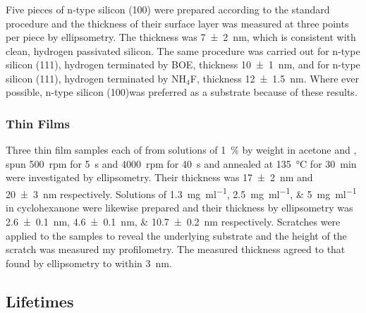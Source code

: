\subsubsection{\sih{}}
Five pieces of \sih{} n-type silicon (100) were prepared according to the standard procedure and the thickness of their surface layer was measured at three points per piece by ellipsometry. The thickness was \SI{7+-2}{\nano\metre}, which is consistent with clean, hydrogen passivated silicon. The same procedure was carried out for n-type silicon (111), hydrogen terminated by BOE, thickness \SI{10+-1}{\nano\metre}, and for n-type silicon (111), hydrogen terminated by NH$_4$F, thickness \SI{12+-1.5}{\nano\metre}. Where ever possible, n-type silicon (100)was preferred as a substrate because of these results.
\subsubsection{\pvdf{} Thin Films}
Three thin film samples each of \pvdf{} from solutions of \SI{1}{\percent} by weight in acetone and \dmf{}, spun \SI{500}{rpm} for \SI{5}{\second} and \SI{4000}{rpm} for \SI{40}{\second} and annealed at \SI{135}{\degreeCelsius} for \SI{30}{\minute} were investigated by ellipsometry. Their thickness was \SI{17+-2}{\nano\metre} and \SI{20+-3}{\nano\metre} respectively. Solutions of \SIlist{1.3;2.5;5}{\milli\gram\per\milli\litre} \pvdf{} in cyclohexanone were likewise prepared and their thickness by ellipsometry was \SIlist{2.6+-0.1;4.6+-0.1;10.7+-0.2}{\nano\metre} respectively. Scratches were applied to the samples to reveal the underlying substrate and the height of the scratch was measured my profilometry. The measured thickness agreed to that found by ellipsometry to within \SI{3}{\nano\metre}.
\subsection{Lifetimes}
